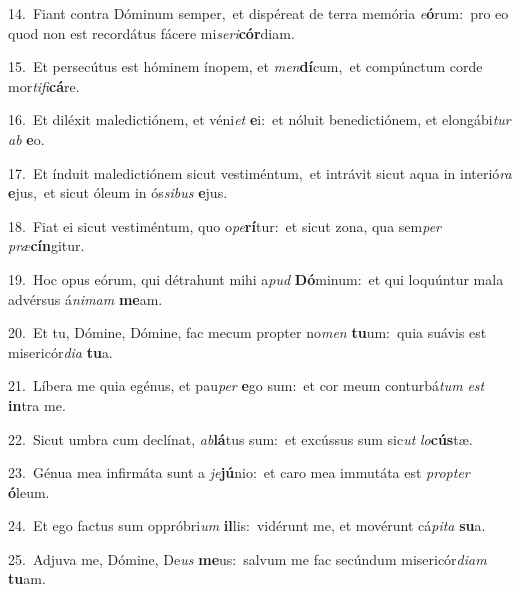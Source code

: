 {\numbfont\textcolor{\numbcolor}{14.}}~Fiant contra Dóminum semper,~\dagger et dispéreat de terra memória \textit{e}\-\textbf{ó}rum:~\star pro eo quod non est recordátus fácere mi\-\textit{se}\-\textit{ri}\textbf{cór}diam.\par
{\numbfont\textcolor{\numbcolor}{15.}}~Et persecútus est hóminem ínopem, et \textit{men}\-\textbf{dí}cum,~\star et compúnctum corde mor\-\textit{ti}\-\textit{fi}\textbf{cá}re.\par
{\numbfont\textcolor{\numbcolor}{16.}}~Et diléxit maledictiónem, et véni\textit{et} \textbf{e}\-i:~\star et nóluit benedictiónem, et elongábi\textit{tur} \textit{ab} \textbf{e}\-o.\par
{\numbfont\textcolor{\numbcolor}{17.}}~Et índuit maledictiónem sicut vestiméntum,~\dagger et intrávit sicut aqua in interió\textit{ra} \textbf{e}\-jus,~\star et sicut óleum in ós\-\textit{si}\-\textit{bus} \textbf{e}\-jus.\par
{\numbfont\textcolor{\numbcolor}{18.}}~Fiat ei sicut vestiméntum, quo o\-\textit{pe}\-\textbf{rí}tur:~\star et sicut zona, qua sem\textit{per} \textit{præ}\-\textbf{cín}gitur.\par
{\numbfont\textcolor{\numbcolor}{19.}}~Hoc opus eórum, qui détrahunt mihi a\textit{pud} \textbf{Dó}\-minum:~\star et qui loquúntur mala advérsus á\-\textit{ni}\-\textit{mam} \textbf{me}\-am.\par
{\numbfont\textcolor{\numbcolor}{20.}}~Et tu, Dómine, Dómine, fac mecum propter no\textit{men} \textbf{tu}\-um:~\star quia suávis est misericór\-\textit{di}\-\textit{a} \textbf{tu}\-a.\par
{\numbfont\textcolor{\numbcolor}{21.}}~Líbera me quia egénus, et pau\textit{per} \textbf{e}\-go sum:~\star et cor meum conturbá\textit{tum} \textit{est} \textbf{in}\-tra me.\par
{\numbfont\textcolor{\numbcolor}{22.}}~Sicut umbra cum declínat, \textit{ab}\-\textbf{lá}tus sum:~\star et excússus sum sic\textit{ut} \textit{lo}\-\textbf{cús}tæ.\par
{\numbfont\textcolor{\numbcolor}{23.}}~Génua mea infirmáta sunt a \textit{je}\-\textbf{jú}nio:~\star et caro mea immutáta est \textit{prop}\-\textit{ter} \textbf{ó}\-leum.\par
{\numbfont\textcolor{\numbcolor}{24.}}~Et ego factus sum oppróbri\textit{um} \textbf{il}\-lis:~\star vidérunt me, et movérunt cá\-\textit{pi}\-\textit{ta} \textbf{su}\-a.\par
{\numbfont\textcolor{\numbcolor}{25.}}~Adjuva me, Dómine, De\textit{us} \textbf{me}\-us:~\star salvum me fac secúndum misericór\-\textit{di}\-\textit{am} \textbf{tu}\-am.\par
